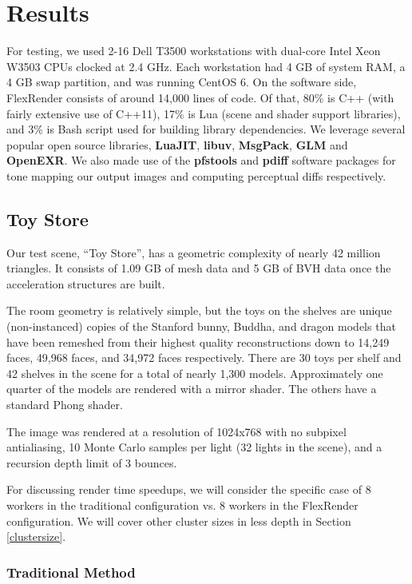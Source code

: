 \documentclass[a4paper,twoside]{article}
\begin{document}
\section{Results}
\label{results}

For testing, we used 2-16 Dell T3500 workstations with dual-core Intel Xeon
W3503 CPUs clocked at 2.4 GHz. Each workstation had 4 GB of system RAM, a 4 GB
swap partition, and was running CentOS 6.  On the software side, FlexRender consists of around 14,000 lines of code. Of
that, 80\% is C++ (with fairly extensive use of C++11), 17\% is Lua (scene and
shader support libraries), and 3\% is Bash script used for building library
dependencies.  We leverage several popular open source libraries, \textbf{LuaJIT}, \textbf{libuv}, \textbf{MsgPack}, \textbf{GLM} and \textbf{OpenEXR}.  We also made use of the \textbf{pfstools} and \textbf{pdiff} software packages
for tone mapping our output images and computing perceptual diffs respectively.

\subsection{Toy Store}
\label{toystore}

Our test scene, ``Toy Store'', has a geometric complexity of nearly 42 million
triangles. It consists of 1.09 GB of mesh data and 5 GB of BVH data once the
acceleration structures are built.

The room geometry is relatively simple, but the toys on the shelves are unique
(non-instanced) copies of the Stanford bunny, Buddha, and dragon models that
have been remeshed from their highest quality reconstructions down to 14,249
faces, 49,968 faces, and 34,972 faces respectively. There are 30 toys per
shelf and 42 shelves in the scene for a total of nearly 1,300 models. Approximately
one quarter of the models are rendered with a mirror shader. The others have
a standard Phong shader.

The image was rendered at a resolution of 1024x768 with no subpixel antialiasing,
10 Monte Carlo samples per light (32 lights in the scene), and a recursion
depth limit of 3 bounces.

For discussing render time speedups, we will consider the specific case of 8
workers in the traditional configuration vs. 8 workers in the FlexRender
configuration. We will cover other cluster sizes in less depth in Section
\ref{clustersize}.

\subsubsection{Traditional Method}
\label{toystoretraditional}
\end{document}
